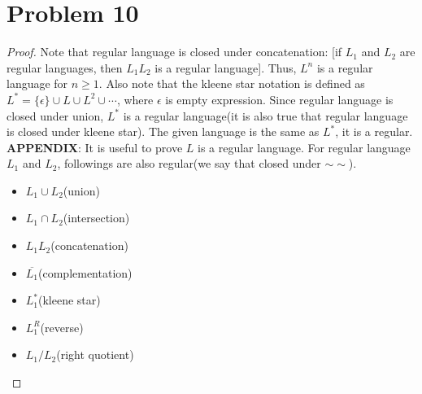 \section*{Problem 10}
	\begin{proof}
		Note that regular language is closed under concatenation: [if $L_1$ and $L_2$ are regular languages, then $L_1L_2$ is a regular language]. Thus, $L^n$ is a regular language for $n\geq 1$. Also note that the kleene star notation is defined as $L^* = \{\epsilon\}\cup L\cup L^2\cup\cdots$, where $\epsilon$ is empty expression. Since regular language is closed under union, $L^*$ is a regular language(it is also true that regular language is closed under kleene star). The given language is the same as $L^*$, it is a regular.\\
		{\color{cyan}\textbf{APPENDIX}}: It is useful to prove $L$ is a regular language. For regular language $L_1$ and $L_2$, followings are also regular(we say that closed under $\sim\sim$).
		\begin{itemize}
			\item $L_1\cup L_2$(union)
			\item $L_1\cap L_2$(intersection)
			\item $L_1L_2$(concatenation)
			\item $\overline{L_1}$(complementation)
			\item $L_1^*$(kleene star)
			\item $L_1^R$(reverse)
			\item $L_1/L_2$(right quotient)
		\end{itemize}
	\end{proof}